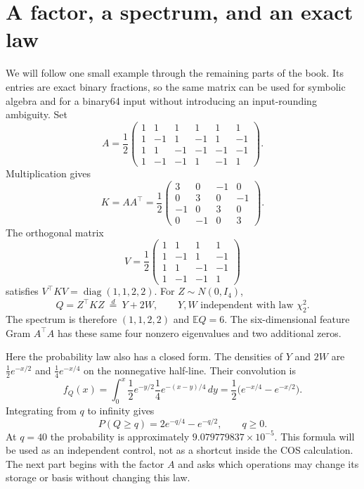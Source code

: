 \section{A factor, a spectrum, and an exact law}\label{sec:worked-law}
We will follow one small example through the remaining parts of the book. Its entries are exact binary fractions, so the same matrix can be used for symbolic algebra and for a binary64 input without introducing an input-rounding ambiguity. Set
\[
A=\frac12
\begin{pmatrix}
 1& 1& 1& 1& 1& 1\\
 1&-1& 1&-1& 1&-1\\
 1& 1&-1&-1&-1&-1\\
 1&-1&-1& 1&-1& 1
\end{pmatrix}.
\]
Multiplication gives
\[
K=AA^\top=\frac12
\begin{pmatrix}
3&0&-1&0\\0&3&0&-1\\-1&0&3&0\\0&-1&0&3
\end{pmatrix}.
\]
The orthogonal matrix
\[
V=\frac12
\begin{pmatrix}
1&1&1&1\\1&-1&1&-1\\1&1&-1&-1\\1&-1&-1&1
\end{pmatrix}
\]
satisfies $V^\top K V=\operatorname{diag}(1,1,2,2)$. For $Z\sim N(0,I_4)$,
\[
Q=Z^\top KZ\ \overset d=\ Y+2W,
\qquad Y,W\text{ independent with law }\chi^2_2.
\]
The spectrum is therefore $(1,1,2,2)$ and $\mathbb E Q=6$. The six-dimensional feature Gram $A^\top A$ has these same four nonzero eigenvalues and two additional zeros.

Here the probability law also has a closed form. The densities of $Y$ and $2W$ are $\tfrac12e^{-x/2}$ and $\tfrac14e^{-x/4}$ on the nonnegative half-line. Their convolution is
\[
f_Q(x)=\int_0^x\frac12e^{-y/2}\frac14e^{-(x-y)/4}\,dy
       =\frac12\bigl(e^{-x/4}-e^{-x/2}\bigr).
\]
Integrating from $q$ to infinity gives
\begin{equation}
P(Q\ge q)=2e^{-q/4}-e^{-q/2},\qquad q\ge0.
\label{eq:worked-exact-tail}
\end{equation}
At $q=40$ the probability is approximately $9.079779837\times10^{-5}$. This formula will be used as an independent control, not as a shortcut inside the COS calculation. The next part begins with the factor $A$ and asks which operations may change its storage or basis without changing this law.
